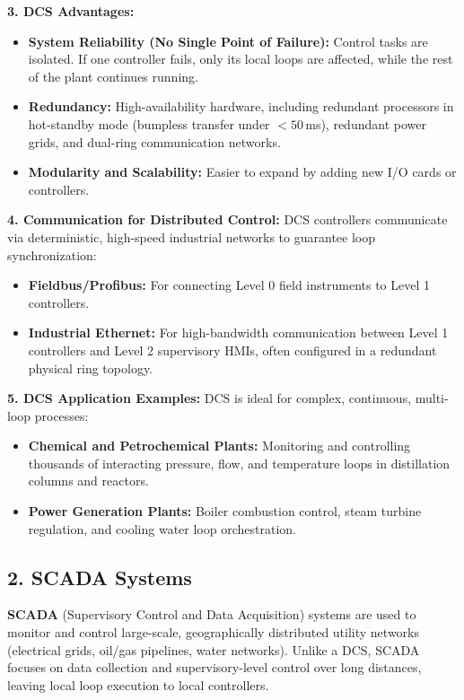 \documentclass[12pt,a4paper]{article}
\begin{document}
\textbf{3. DCS Advantages:}
\begin{itemize}[leftmargin=*, itemsep=2pt]
  \item \textbf{System Reliability (No Single Point of Failure):} Control tasks are isolated. If one controller fails, only its local loops are affected, while the rest of the plant continues running.
  \item \textbf{Redundancy:} High-availability hardware, including redundant processors in hot-standby mode (bumpless transfer under $< 50\,$ms), redundant power grids, and dual-ring communication networks.
  \item \textbf{Modularity and Scalability:} Easier to expand by adding new I/O cards or controllers.
\end{itemize}

\textbf{4. Communication for Distributed Control:}
DCS controllers communicate via deterministic, high-speed industrial networks to guarantee loop synchronization:
\begin{itemize}[leftmargin=*, itemsep=2pt]
  \item \textbf{Fieldbus/Profibus:} For connecting Level 0 field instruments to Level 1 controllers.
  \item \textbf{Industrial Ethernet:} For high-bandwidth communication between Level 1 controllers and Level 2 supervisory HMIs, often configured in a redundant physical ring topology.
\end{itemize}

\textbf{5. DCS Application Examples:}
DCS is ideal for complex, continuous, multi-loop processes:
\begin{itemize}[leftmargin=*, itemsep=2pt]
  \item \textbf{Chemical and Petrochemical Plants:} Monitoring and controlling thousands of interacting pressure, flow, and temperature loops in distillation columns and reactors.
  \item \textbf{Power Generation Plants:} Boiler combustion control, steam turbine regulation, and cooling water loop orchestration.
\end{itemize}

\subsection{2. SCADA Systems}
\textbf{SCADA} (Supervisory Control and Data Acquisition) systems are used to monitor and control large-scale, geographically distributed utility networks (electrical grids, oil/gas pipelines, water networks). Unlike a DCS, SCADA focuses on data collection and supervisory-level control over long distances, leaving local loop execution to local controllers.
\end{document}
